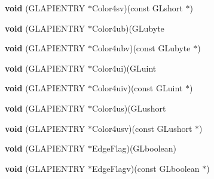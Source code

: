 \begin{DoxyCompactItemize}
\mbox{\label{struct_____g_ldispatch_table_rec_a85e9a99e41293ed63e3864bc225d62e4}} 
{\bfseries void} (G\+L\+A\+P\+I\+E\+N\+T\+RY $\ast$Color4sv)(const G\+Lshort $\ast$)
\item 
\mbox{\label{struct_____g_ldispatch_table_rec_aadc5555d78f08dc054025c310a4bf9a4}} 
{\bfseries void} (G\+L\+A\+P\+I\+E\+N\+T\+RY $\ast$Color4ub)(G\+Lubyte
\item 
\mbox{\label{struct_____g_ldispatch_table_rec_a0870a31c04537e4ed29c0ff84d41305f}} 
{\bfseries void} (G\+L\+A\+P\+I\+E\+N\+T\+RY $\ast$Color4ubv)(const G\+Lubyte $\ast$)
\item 
\mbox{\label{struct_____g_ldispatch_table_rec_a6a680d88c88465ea1c3c1797448c84bf}} 
{\bfseries void} (G\+L\+A\+P\+I\+E\+N\+T\+RY $\ast$Color4ui)(G\+Luint
\item 
\mbox{\label{struct_____g_ldispatch_table_rec_ac061726c52bffdba728563b7caa021aa}} 
{\bfseries void} (G\+L\+A\+P\+I\+E\+N\+T\+RY $\ast$Color4uiv)(const G\+Luint $\ast$)
\item 
\mbox{\label{struct_____g_ldispatch_table_rec_a174f28997204e1944d091f160cf1f90f}} 
{\bfseries void} (G\+L\+A\+P\+I\+E\+N\+T\+RY $\ast$Color4us)(G\+Lushort
\item 
\mbox{\label{struct_____g_ldispatch_table_rec_a0b6d505408450fc048dd12b7b4294050}} 
{\bfseries void} (G\+L\+A\+P\+I\+E\+N\+T\+RY $\ast$Color4usv)(const G\+Lushort $\ast$)
\item 
\mbox{\label{struct_____g_ldispatch_table_rec_a70871fe57a188bac3644b81b2012fba6}} 
{\bfseries void} (G\+L\+A\+P\+I\+E\+N\+T\+RY $\ast$Edge\+Flag)(G\+Lboolean)
\item 
\mbox{\label{struct_____g_ldispatch_table_rec_a168dcb7c1b4406c705832957f25e6ff9}} 
{\bfseries void} (G\+L\+A\+P\+I\+E\+N\+T\+RY $\ast$Edge\+Flagv)(const G\+Lboolean $\ast$)
\item 

\end{DoxyCompactItemize}
